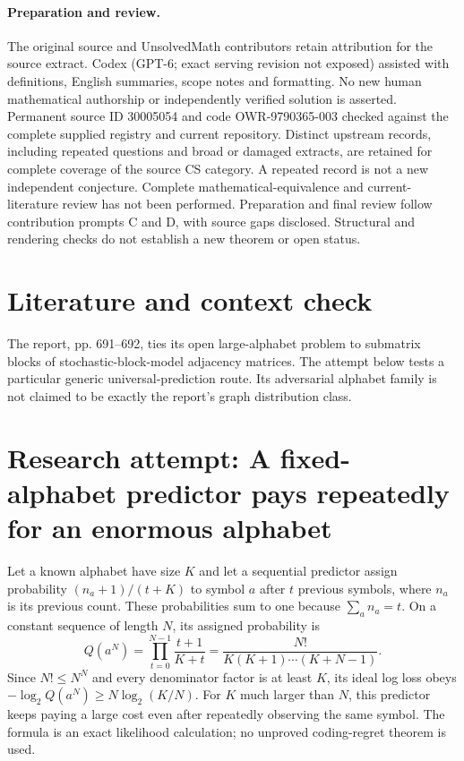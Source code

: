\documentclass[11pt]{article}
\begin{document}
\paragraph{Preparation and review.}
The original source and UnsolvedMath contributors retain attribution for the source extract. Codex (GPT-6; exact serving revision not exposed) assisted with definitions, English summaries, scope notes and formatting. No new human mathematical authorship or independently verified solution is asserted. Permanent source ID 30005054 and code OWR-9790365-003 checked against the complete supplied registry and current repository. Distinct upstream records, including repeated questions and broad or damaged extracts, are retained for complete coverage of the source CS category. A repeated record is not a new independent conjecture. Complete mathematical-equivalence and current-literature review has not been performed. Preparation and final review follow contribution prompts C and D, with source gaps disclosed. Structural and rendering checks do not establish a new theorem or open status.
\label{end:30005054}

\section{Literature and context check}
The report, pp. 691--692, ties its open large-alphabet problem to submatrix blocks of stochastic-block-model adjacency matrices. The attempt below tests a particular generic universal-prediction route. Its adversarial alphabet family is not claimed to be exactly the report's graph distribution class.
\section{Research attempt: A fixed-alphabet predictor pays repeatedly for an enormous alphabet}
Let a known alphabet have size $K$ and let a sequential predictor assign probability $(n_a+1)/(t+K)$ to symbol $a$ after $t$ previous symbols, where $n_a$ is its previous count. These probabilities sum to one because $\sum_a n_a=t$. On a constant sequence of length $N$, its assigned probability is
\[
Q(a^N)=\prod_{t=0}^{N-1}\frac{t+1}{K+t}
=\frac{N!}{K(K+1)\cdots(K+N-1)}.
\]
Since $N!\le N^N$ and every denominator factor is at least $K$, its ideal log loss obeys $-\log_2 Q(a^N)\ge N\log_2(K/N)$. For $K$ much larger than $N$, this predictor keeps paying a large cost even after repeatedly observing the same symbol. The formula is an exact likelihood calculation; no unproved coding-regret theorem is used.
\end{document}

